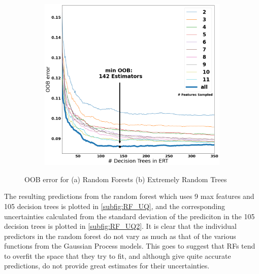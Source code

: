 \documentclass[a4paper, twoside, final, 12pt]{article}
\begin{document}
{\begin{figure}
\begin{subfigure}{0.48\linewidth}
	\end{subfigure}
	\begin{subfigure}{0.5\linewidth}
		\centering
		\includegraphics[scale=0.2]{./src/ERT_oob_error}
		\caption{}
		\label{subfig:rf_rmse}
	\end{subfigure}
	\caption{OOB error for (a) Random Forests (b) Extremely Random Trees}
	\label{fig:RF_exp}
\end{figure}

The resulting predictions from the random forest which uses 9 max features and 105 decision trees is plotted in \ref{subfig:RF_UQ}, and the corresponding uncertainties calculated from the standard deviation of the prediciton in the 105 decision trees is plotted in \ref{subfig:RF_UQ2}.
It is clear that the individual predictors in the random forest do not vary as much as that of the various functions from the Gaussian Process models. 
This goes to suggest that RFs tend to overfit the space that they try to fit, and although give quite accurate predictions, do not provide great estimates for their uncertainties. 

}
\end{document}
